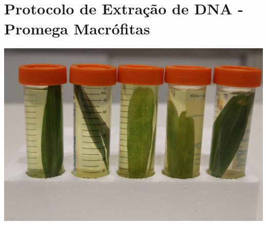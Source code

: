 \documentclass[
  letterpaper,
  DIV=11,
  numbers=noendperiod]{scrreprt}
\begin{document}
\hypertarget{protocolo-de-extrauxe7uxe3o-de-dna---promega-macruxf3fitas}{%
\section{\texorpdfstring{Protocolo de Extração de DNA - Promega
\textbf{Macrófitas}}{Protocolo de Extração de DNA - Promega Macrófitas}}\label{protocolo-de-extrauxe7uxe3o-de-dna---promega-macruxf3fitas}}

\includegraphics{figures/extracao-macrofitas.JPG}
\end{document}
